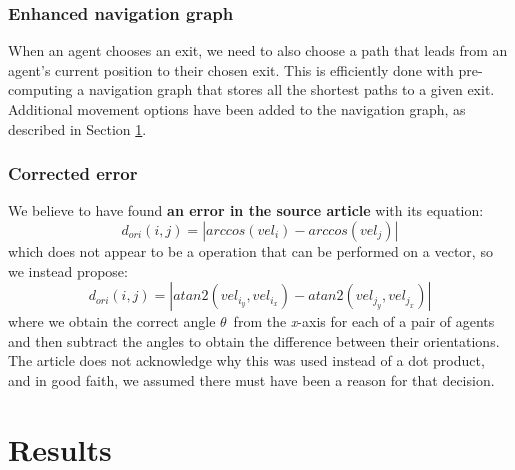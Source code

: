 \documentclass[9pt]{pnas-new}
\begin{document}

\subsubsection{Enhanced navigation graph} When an agent chooses an exit, we need to also choose a path that leads from an agent's current position to their chosen exit. This is efficiently done with pre-computing a navigation graph that stores all the shortest paths to a given exit. Additional movement options have been added to the navigation graph, as described in Section \ref{res}.


\subsubsection{Corrected error}
We believe to have found \textbf{an error in the source article} with its equation: \begin{equation*}
    d_{ori}(i,j)=|arccos(vel_i)-arccos(vel_j)|
\end{equation*}
which does not appear to be a operation that can be performed on a vector, so we instead propose: \begin{equation*}
    d_{ori}(i,j)=|atan2(vel_{i_y},vel_{i_x})-atan2(vel_{j_y},vel_{j_x})|
\end{equation*}
where we obtain the correct angle ${\theta}$\ from the \textit{x}-axis \cite{wikiatan2} for each of a pair of agents and then subtract the angles to obtain the difference between their orientations. The article does not acknowledge why this was used instead of a dot product, and in good faith, we assumed there must have been a reason for that decision.

\section{Results} \label{res}

\end{document}
